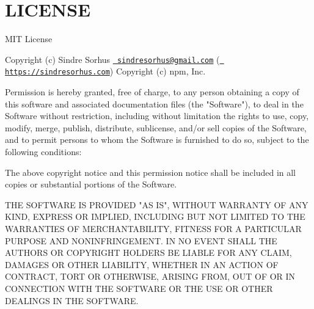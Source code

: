 \chapter{LICENSE}
\hypertarget{md__2_users_2hello_2_documents_2_git_hub_2finalproject-engine-drop-table-engines_2_engine_2src_2530eebd2c196f25200faf64a4242dbba}{}\label{md__2_users_2hello_2_documents_2_git_hub_2finalproject-engine-drop-table-engines_2_engine_2src_2530eebd2c196f25200faf64a4242dbba}
MIT License

Copyright (c) Sindre Sorhus \href{mailto:sindresorhus@gmail.com}{\texttt{ sindresorhus@gmail.\+com}} (\href{https://sindresorhus.com}{\texttt{ https\+://sindresorhus.\+com}}) Copyright (c) npm, Inc.

Permission is hereby granted, free of charge, to any person obtaining a copy of this software and associated documentation files (the "{}\+Software"{}), to deal in the Software without restriction, including without limitation the rights to use, copy, modify, merge, publish, distribute, sublicense, and/or sell copies of the Software, and to permit persons to whom the Software is furnished to do so, subject to the following conditions\+:

The above copyright notice and this permission notice shall be included in all copies or substantial portions of the Software.

THE SOFTWARE IS PROVIDED "{}\+AS IS"{}, WITHOUT WARRANTY OF ANY KIND, EXPRESS OR IMPLIED, INCLUDING BUT NOT LIMITED TO THE WARRANTIES OF MERCHANTABILITY, FITNESS FOR A PARTICULAR PURPOSE AND NONINFRINGEMENT. IN NO EVENT SHALL THE AUTHORS OR COPYRIGHT HOLDERS BE LIABLE FOR ANY CLAIM, DAMAGES OR OTHER LIABILITY, WHETHER IN AN ACTION OF CONTRACT, TORT OR OTHERWISE, ARISING FROM, OUT OF OR IN CONNECTION WITH THE SOFTWARE OR THE USE OR OTHER DEALINGS IN THE SOFTWARE. 